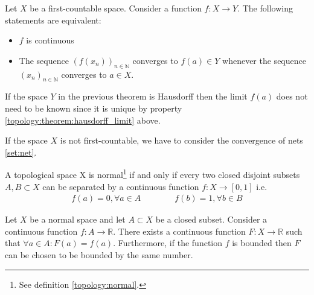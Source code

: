 
    \begin{property}[Continuity]
        Let $X$ be a first-countable space. Consider a function $f:X\rightarrow Y$. The following statements are equivalent:
        \begin{itemize}
            \item $f$ is continuous
            \item The sequence $(f(x_n))_{n\in\mathbb{N}}$ converges to $f(a)\in Y$ whenever the sequence $(x_n)_{n\in\mathbb{N}}$ converges to $a\in X$.
        \end{itemize}
    \end{property}
    \begin{result}
       If the space $Y$ in the previous theorem is Hausdorff then the limit $f(a)$ does not need to be known since it is unique by property \ref{topology:theorem:hausdorff_limit} above.
    \end{result}
    \begin{remark}
        If the space $X$ is not first-countable, we have to consider the convergence of nets \ref{set:net}.
    \end{remark}

    \begin{theorem}\label{topology:urysohns_lemma}
        A topological space X is normal\footnote{See definition \ref{topology:normal}.} if and only if every two closed disjoint subsets $A, B\subset X$ can be separated by a continuous function $f:X\rightarrow [0, 1]$ i.e.
        \begin{gather}
            f(a) = 0, \forall a\in A\qquad\qquad f(b) = 1, \forall b\in B
        \end{gather}
    \end{theorem}

    \begin{theorem}
        Let $X$ be a normal space and let $A\subset X$ be a closed subset. Consider a continuous function $f:A\rightarrow\mathbb{R}$. There exists a continuous function $F:X\rightarrow\mathbb{R}$ such that $\forall a\in A: F(a) = f(a)$. Furthermore, if the function $f$ is bounded then $F$ can be chosen to be bounded by the same number.
    \end{theorem}

